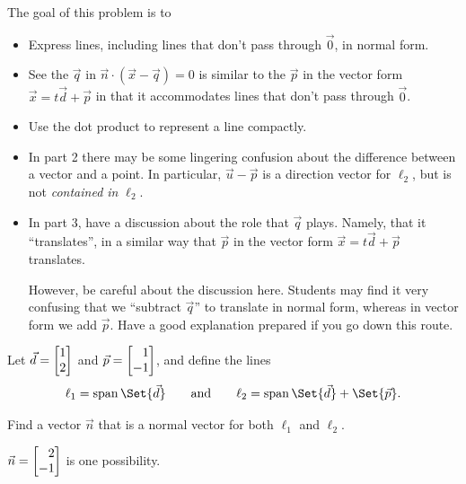 \documentclass{workbook}
\newcommand{\displayonlynewpage}{\begin{displayonly}\newpage\end{displayonly}}
\newcommand{\bookonlynewpage}{\begin{bookonly}\newpage\end{bookonly}}
\begin{document}
\begin{slide}
	\begin{bookonly}\singlegrid\end{bookonly}
	\bookonlynewpage
	\displayonlynewpage

	\question
	\begin{annotation}
		\begin{goals}

			The goal of this problem is to
			\begin{itemize}
				\item Express lines, including lines that don't pass through $\vec 0$,
					in normal form.
				\item See the $\vec q$ in $\vec n\cdot (\vec x-\vec q)=0$ is similar
					to the $\vec p$ in the vector form $\vec x=t\vec d+\vec p$ in
					that it accommodates lines that don't pass through $\vec 0$.
				\item Use the dot product to represent a line compactly.
			\end{itemize}
		\end{goals}

		\begin{notes}
			\begin{itemize}
				\item In part 2 there may be some lingering confusion about the difference between
					a vector and a point. In particular, $\vec u-\vec p$ is a direction vector for $\ell_2$,
					but is not \emph{contained in} $\ell_2$.
				\item In part 3, have a discussion about the role that $\vec q$ plays. Namely,
					that it ``translates'', in a similar way that $\vec p$ in the vector
					form $\vec x=t\vec d+\vec p$ translates.

					However, be careful about the discussion here. Students may find it very
					confusing that we ``subtract $\vec q$'' to translate in normal form, whereas in
					vector form we add $\vec p$. Have a good explanation prepared if you go
					down this route.
			\end{itemize}
		\end{notes}
	\end{annotation}
	Let $\vec d=\mat{1\\2}$ and $\vec p=\mat{1\\-1}$, and define the lines
	\[
		\ell_1 = \Span\Set{\vec d}\qquad\text{and}\qquad \ell_2=\Span\Set{\vec d}+\Set{\vec p}.
	\]
	\begin{parts}
		\item Find a vector $\vec n$ that is a normal vector for both $\ell_1$
			and	$\ell_2$.
			\begin{solution}
				$\vec n=\mat{2\\-1}$ is one possibility.


\end{solution}
\end{parts}
\end{slide}
\end{document}
